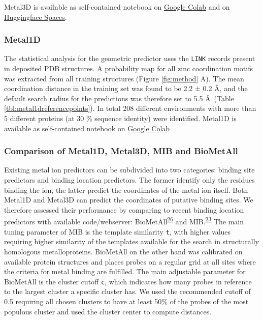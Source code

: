 \documentclass[ lineno,
  9pt]{elife}
\begin{document}
Metal3D is available as self-contained notebook on \href{https://colab.research.google.com/github/lcbc-epfl/metal-site-prediction/blob/main/Metal3D/ColabMetal.ipynb}{Google Colab} and on \href{https://hf.space/simonduerr/metal3d}{Huggingface Spaces}.

\hypertarget{metal1d}{%
\subsubsection{Metal1D}\label{metal1d}}

The statistical analysis for the geometric predictor uses the \texttt{LINK} records present in deposited PDB structures. A probability map for all zinc coordination motifs was extracted from all training structures (Figure \ref{fig:method} A). The mean coordination distance in the training set was found to be 2.2 ± 0.2 \AA , and the default search radius for the predictions was therefore set to 5.5 \AA\, (Table \ref{tbl:metal1dreferencepoints}). In total 208 different environments with more than 5 different proteins (at 30 \% sequence identity) were identified.
Metal1D is available as self-contained notebook on \href{https://colab.research.google.com/github/lcbc-epfl/metal-site-prediction/blob/main/Metal1D/ColabMetal1D.ipynb}{Google Colab}

\hypertarget{comparison-of-metal1d-metal3d-mib-and-biometall}{%
\subsubsection{Comparison of Metal1D, Metal3D, MIB and BioMetAll}\label{comparison-of-metal1d-metal3d-mib-and-biometall}}

Existing metal ion predictors can be subdivided into two categories: binding site predictors and binding location predictors. The former identify only the residues binding the ion, the latter predict the coordinates of the metal ion itself. Both Metal1D and Metal3D can predict the coordinates of putative binding sites. We therefore assessed their performance by comparing to recent binding location predictors with available code/webserver: BioMetAll\textsuperscript{\protect\hyperlink{ref-iHxzzTCG}{26}} and MIB.\textsuperscript{\protect\hyperlink{ref-1HMhB3vxM}{23}} The main tuning parameter of MIB is the template similarity \texttt{t}, with higher values requiring higher similarity of the templates available for the search in structurally homologous metalloproteins. BioMetAll on the other hand was calibrated on available protein structures and places probes on a regular grid at all sites where the criteria for metal binding are fulfilled. The main adjustable parameter for BioMetAll is the cluster cutoff \texttt{c}, which indicates how many probes in reference to the largest cluster a specific cluster has. We used the recommended cutoff of 0.5 requiring all chosen clusters to have at least 50\% of the probes of the most populous cluster and used the cluster center to compute distances.
\end{document}
